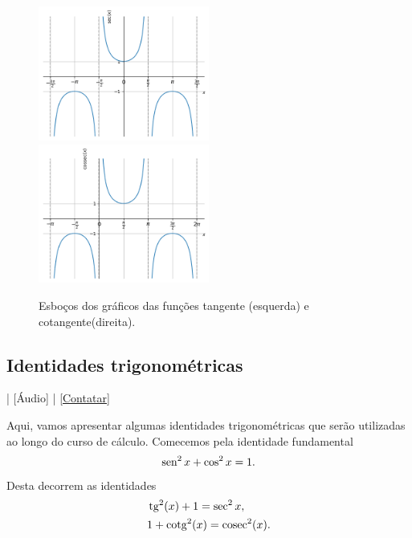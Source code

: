 \begin{figure}[H]
  \centering
  \includegraphics[width=0.5\textwidth]{./cap_funcao/dados/fig_co_sec_graficos/fig_sec_grafico}~
  \includegraphics[width=0.5\textwidth]{./cap_funcao/dados/fig_co_sec_graficos/fig_cosec_grafico}
  \caption{Esboços dos gráficos das funções tangente (esquerda) e cotangente(direita).}
  \label{fig:co_sec_graficos}
\end{figure}

\subsection{Identidades trigonométricas}

\begin{flushright}
  [Vídeo] | [Áudio] | \href{https://phkonzen.github.io/notas/contato.html}{[Contatar]}
\end{flushright}

Aqui, vamos apresentar algumas identidades trigonométricas que serão utilizadas ao longo do curso de cálculo. Comecemos pela identidade fundamental
\begin{equation}
  \operatorname{sen}^2 x + \cos^2 x = 1.
\end{equation}
Desta decorrem as identidades
\begin{align}
  &\operatorname{tg}^2(x) + 1 = \sec^2 x,\\
  &1 + \operatorname{cotg}^2(x) = \operatorname{cosec}^2(x).
\end{align}


